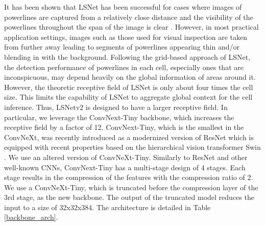 \documentclass[journal]{IEEEtran}
\newcommand{\commentM}[1]{\textbf{\textcolor{blue}{M: #1}}}
\begin{document}

It has been shown that LSNet has been successful for cases where images of powerlines are captured from a relatively close distance and the visibility of the powerlines throughout the span of the image is clear \cite{Nguyen2020}. However, in most practical application settings, images such as those used for visual inspection are taken from further away leading to segments of powerlines appearing thin and/or blending in with the background. Following the grid-based approach of LSNet, the detection performance of powerlines in each cell, especially ones that are inconspicuous, may depend heavily on the global information of areas around it. However, the theoretic receptive field of LSNet is only about four times the cell size. %
This limits the capability of LSNet to aggregate global context for the cell inference.  Thus, LSNetv2 is designed to have a larger receptive field. In particular, we leverage the ConvNext-Tiny backbone, which increases the receptive field by a factor of 12. %
ConvNext-Tiny, which is the smallest in the ConvNeXt, was recently introduced as a modernized version of ResNet \cite{resnet} which is equipped with recent properties based on the hierarchical vision transformer Swin \cite{swin}. 
We use an altered version of ConvNeXt-Tiny. Similarly to ResNet and other well-known CNNs, ConvNext-Tiny has a multi-stage design of 4 stages. Each stage results in the compression of the features with the compression ratio of 2. We use a ConvNeXt-Tiny, which is truncated before the compression layer of the 3rd stage, as the new backbone. The output of the truncated model reduces the input to a size of 32x32x384. %
The architecture is detailed in Table \ref{backbone_arch}.
\end{document}
